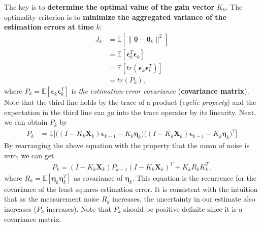 The key is to \textbf{determine the optimal value of the gain vector} $K_k$. The optimality criterion is to \textbf{minimize the aggregated variance of the estimation errors at time} $k$: 
\begin{align*}
	J_k &= \mathbb{E}[\|\boldsymbol{\theta}-\boldsymbol{\theta}_k\|^2]\\
		&= \mathbb{E}[\boldsymbol{\epsilon}_{k}^T\boldsymbol{\epsilon}_{k}]\\
		&= \mathbb{E}[tr(\boldsymbol{\epsilon}_{k}\boldsymbol{\epsilon}_{k}^T)]\\
		&= tr(P_k),
\end{align*}
where $P_k=\mathbb{E}[\boldsymbol{\epsilon}_{k}\boldsymbol{\epsilon}_{k}^T]$ is \textit{the estimation-error covariance} (\ie \textbf{covariance matrix}). Note that the third line holds by the trace of a product (\ie \textit{cyclic property}) and the expectation in the third line can go into the trace operator by its linearity. Next, we can obtain $P_k$ by
\begin{align*}
	P_k &= \mathbb{E}\bigg[\big((I-K_k \mathbf{X}_k)\boldsymbol{\epsilon}_{k-1}-K_k\boldsymbol{\eta}_k\big)\big((I-K_k \mathbf{X}_k)\boldsymbol{\epsilon}_{k-1}-K_k\boldsymbol{\eta}_k\big)^T\bigg]
\end{align*}
By rearranging the above equation with the property that the mean of noise is zero, we can get
\begin{align}
	P_k = (I-K_k \mathbf{X}_k)P_{k-1}(I-K_k \mathbf{X}_k)^T+K_kR_kK_k^T,
	\label{eq:rls_estimation_cov}
\end{align}
where $R_k = \mathbb{E}[\boldsymbol{\eta}_k\boldsymbol{\eta}_k^T]$ as covariance of $\boldsymbol{\eta}_k$. This equation is the recurrence for the covariance of the least squares estimation error. It is consistent with the intuition that as the measurement noise $R_k$ increases, the uncertainty in our estimate also increases (\ie $P_k$ increases).  Note that $P_k$ should be positive definite since it is a covariance matrix.

